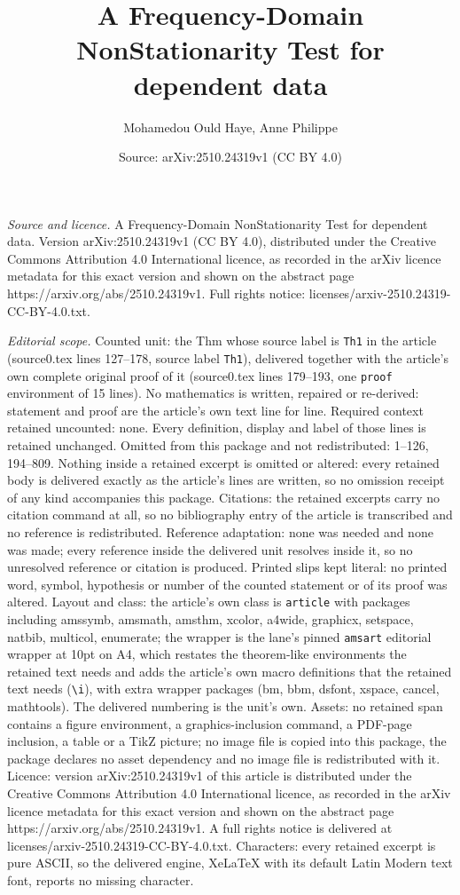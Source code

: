\documentclass[10pt,a4paper]{amsart}
\title[A Frequency-Domain NonStationarity Test for dependent data]{A Frequency-Domain NonStationarity Test for dependent data}
\author{Mohamedou Ould Haye, Anne Philippe}
\date{Source: arXiv:2510.24319v1 (CC BY 4.0)}
\begin{document}
\maketitle

\noindent\emph{Source and licence.} A Frequency-Domain NonStationarity Test for dependent data. Version arXiv:2510.24319v1 (CC BY 4.0), distributed under the Creative Commons Attribution 4.0 International licence, as recorded in the arXiv licence metadata for this exact version and shown on the abstract page https://arxiv.org/abs/2510.24319v1. Full rights notice: licenses/arxiv-2510.24319-CC-BY-4.0.txt.\par\smallskip

\noindent\textit{Editorial scope.} Counted unit: the Thm whose source label is \texttt{Th1} in the article (source0.tex lines 127--178, source label \texttt{Th1}), delivered together with the article's own complete original proof of it (source0.tex lines 179--193, one \texttt{proof} environment of 15 lines). No mathematics is written, repaired or re-derived: statement and proof are the article's own text line for line. Required context retained uncounted: none. Every definition, display and label of those lines is retained unchanged. Omitted from this package and not redistributed: 1--126, 194--809. Nothing inside a retained excerpt is omitted or altered: every retained body is delivered exactly as the article's lines are written, so no omission receipt of any kind accompanies this package. Citations: the retained excerpts carry no citation command at all, so no bibliography entry of the article is transcribed and no reference is redistributed. Reference adaptation: none was needed and none was made; every reference inside the delivered unit resolves inside it, so no unresolved reference or citation is produced. Printed slips kept literal: no printed word, symbol, hypothesis or number of the counted statement or of its proof was altered. Layout and class: the article's own class is \texttt{article} with packages including amssymb, amsmath, amsthm, xcolor, a4wide, graphicx, setspace, natbib, multicol, enumerate; the wrapper is the lane's pinned \texttt{amsart} editorial wrapper at 10pt on A4, which restates the theorem-like environments the retained text needs and adds the article's own macro definitions that the retained text needs (\texttt{\textbackslash i}), with extra wrapper packages (bm, bbm, dsfont, xspace, cancel, mathtools). The delivered numbering is the unit's own. Assets: no retained span contains a figure environment, a graphics-inclusion command, a PDF-page inclusion, a table or a TikZ picture; no image file is copied into this package, the package declares no asset dependency and no image file is redistributed with it. Licence: version arXiv:2510.24319v1 of this article is distributed under the Creative Commons Attribution 4.0 International licence, as recorded in the arXiv licence metadata for this exact version and shown on the abstract page https://arxiv.org/abs/2510.24319v1. A full rights notice is delivered at licenses/arxiv-2510.24319-CC-BY-4.0.txt. Characters: every retained excerpt is pure ASCII, so the delivered engine, XeLaTeX with its default Latin Modern text font, reports no missing character.
\end{document}
